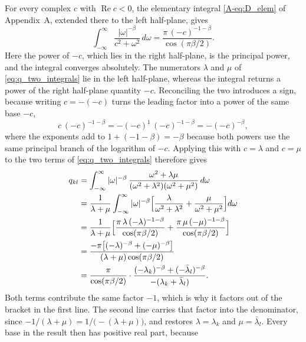 \documentclass[12pt]{article}
\begin{document}
For every complex $c$ with
$\operatorname{Re}c<0$, the elementary integral \eqref{A-eq:D_elem} of Appendix~A, extended there to the left half-plane, gives
\begin{equation}
    \int_{-\infty}^{\infty}\frac{|\omega|^{-\beta}}{c^2+\omega^2}\,d\omega
    =\frac{\pi\,(-c)^{-1-\beta}}{\cos(\pi\beta/2)}.
    \label{eq:Ibeta_eval}
\end{equation}
Here the power of $-c$, which lies in the right half-plane, is the principal power, and the integral converges absolutely. The numerators
$\lambda$ and $\mu$ of \eqref{eq:q_two_integrals} lie in the left half-plane, whereas the integral returns a power of
the right half-plane quantity $-c$. Reconciling the two introduces a sign, because writing $c=-(-c)$ turns the leading factor
into a power of the same base $-c$,
\begin{equation}
    c\,(-c)^{-1-\beta}=-(-c)^{1}\,(-c)^{-1-\beta}=-(-c)^{-\beta} ,
    \label{eq:power_sign}
\end{equation}
where the exponents add to $1+(-1-\beta)=-\beta$ because both powers use the same principal branch of the logarithm of $-c$.
Applying this with $c=\lambda$ and $c=\mu$ to the two terms of \eqref{eq:q_two_integrals} therefore gives
\begin{equation}
\begin{aligned}
    q_{kl}&=\int_{-\infty}^{\infty}|\omega|^{-\beta}\,
    \frac{\omega^2+\lambda\mu}{(\omega^2+\lambda^2)(\omega^2+\mu^2)}\,d\omega\\
    &=\frac{1}{\lambda+\mu}\int_{-\infty}^{\infty}|\omega|^{-\beta}
    \Bigl[\frac{\lambda}{\omega^2+\lambda^2}+\frac{\mu}{\omega^2+\mu^2}\Bigr]d\omega\\
    &=\frac{1}{\lambda+\mu}\Bigl[\frac{\pi\,\lambda\,(-\lambda)^{-1-\beta}}{\cos(\pi\beta/2)}+\frac{\pi\,\mu\,(-\mu)^{-1-\beta}}{\cos(\pi\beta/2)}\Bigr]\\
    &=\frac{-\pi\bigl[(-\lambda)^{-\beta}+(-\mu)^{-\beta}\bigr]}{(\lambda+\mu)\cos(\pi\beta/2)}\\
    &=\frac{\pi}{\cos(\pi\beta/2)}\cdot\frac{(-\lambda_k)^{-\beta}+(-\bar\lambda_l)^{-\beta}}{-(\lambda_k+\bar\lambda_l)} .
\end{aligned}
    \label{eq:q_closed}
\end{equation}
Both terms contribute the same factor $-1$, which is why it factors out of the bracket in the first line. The second line
carries that factor into the denominator, since $-1/(\lambda+\mu)=1/\bigl(-(\lambda+\mu)\bigr)$, and restores
$\lambda=\lambda_k$ and $\mu=\bar\lambda_l$. Every base in the result then has positive real part, because
\end{document}
